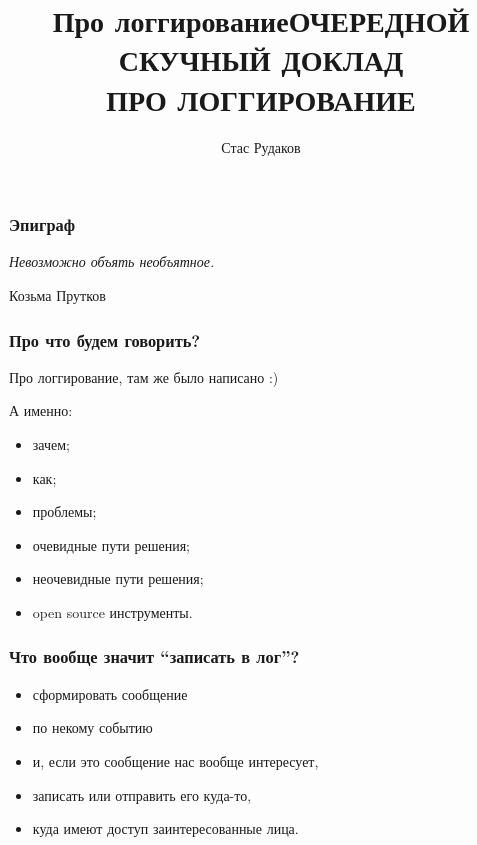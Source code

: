 \documentclass[aspectratio=169]{beamer}
\begin{document}
\title{Про логгирование}
\author{Стас Рудаков}
\date{}

{
\title{ОЧЕРЕДНОЙ СКУЧНЫЙ ДОКЛАД\\ПРО ЛОГГИРОВАНИЕ}
\titleframe
}


\begin{frame}
  \frametitle{Эпиграф}

  \epigraph{{\it Невозможно объять необъятное.}}{Козьма Прутков}
\end{frame}


\begin{frame}
  \frametitle{Про что будем говорить?}
  \pause
  Про логгирование, там же было написано :)
  \pause

  \vspace{1cm}
  А именно:
  \begin{itemize}
    \item зачем;
    \item как;
    \item проблемы;
    \item очевидные пути решения;
    \item неочевидные пути решения;
    \item open source инструменты.
  \end{itemize}
\end{frame}


\begin{frame}
  \frametitle{Что вообще значит ``записать в лог''?}
  \pause
  \begin{itemize}
    \item сформировать сообщение
      \pause
    \item по некому событию
      \pause
    \item и, если это сообщение нас вообще интересует,
      \pause
    \item записать или отправить его куда-то,
      \pause
    \item куда имеют доступ заинтересованные лица.
  \end{itemize}
\end{frame}
\end{document}
